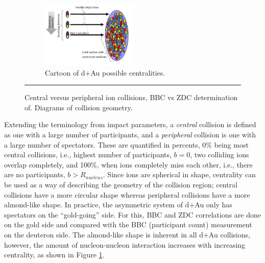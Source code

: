 \begin{figure}
\centering
\ContinuedFloat
\begin{subfigure}[p]{1\textwidth}
  \centering
    \includegraphics[width=0.5\textwidth]{Figures/daucentrality.JPG}

  \caption[Cartoon of d+Au possible centralities.]{Cartoon of d+Au possible centralities.}
  \label{fig:daucentrality}
\end{subfigure}

    \rule{35em}{0.5pt}
  \caption[Central versus peripheral ion collisions, BBC vs ZDC determination of]{Central versus peripheral ion collisions, BBC vs ZDC determination of. Diagrams of collision geometry.}
  \label{fig:centralvsperipheral}
\end{figure}


Extending the terminology from impact parameters, a \textit{central} collision is defined as one with a large number of participants, and a \textit{peripheral} collision is one with a large number of spectators. These are quantified in percents, 0$\%$ being most central collisions, i.e., highest number of participants, $b=0$, two colliding ions overlap completely, and 100$\%$, when ions completely miss each other, i.e., there are no participants, $b > R_{nucleus}$. Since ions are spherical in shape, centrality can be used as a way of describing the geometry of the collision region; central collisions have a more circular shape whereas peripheral collisions have a more almond-like shape. In practice, the asymmetric system of d+Au only has spectators on the ``gold-going'' side. For this, BBC and ZDC correlations are done on the gold side and compared with the BBC (participant count) measurement on the deuteron side. The almond-like shape is inherent in all d+Au collisions, however, the amount of nucleon-nucleon interaction increases with increasing centrality, as shown in Figure \ref{fig:daucentrality}.



